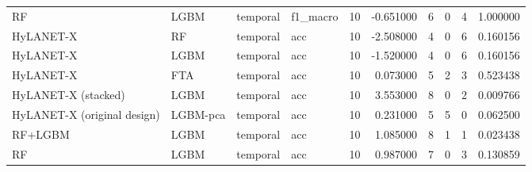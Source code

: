 \begin{tabular}{llllrrrrrr}
RF & LGBM & temporal & f1\_macro & 10 & -0.651000 & 6 & 0 & 4 & 1.000000 \\
HyLANET-X & RF & temporal & acc & 10 & -2.508000 & 4 & 0 & 6 & 0.160156 \\
HyLANET-X & LGBM & temporal & acc & 10 & -1.520000 & 4 & 0 & 6 & 0.160156 \\
HyLANET-X & FTA & temporal & acc & 10 & 0.073000 & 5 & 2 & 3 & 0.523438 \\
HyLANET-X (stacked) & LGBM & temporal & acc & 10 & 3.553000 & 8 & 0 & 2 & 0.009766 \\
HyLANET-X (original design) & LGBM-pca & temporal & acc & 10 & 0.231000 & 5 & 5 & 0 & 0.062500 \\
RF+LGBM & LGBM & temporal & acc & 10 & 1.085000 & 8 & 1 & 1 & 0.023438 \\
RF & LGBM & temporal & acc & 10 & 0.987000 & 7 & 0 & 3 & 0.130859 \\
\bottomrule
\end{tabular}
